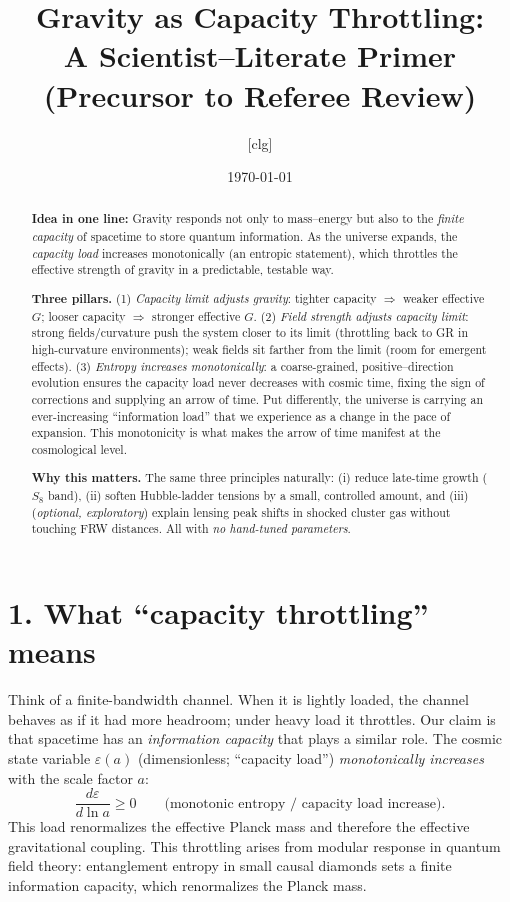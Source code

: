 \documentclass[aps,prd,onecolumn,superscriptaddress,nofootinbib]{revtex4-2}
\newcommand{\eps}{\varepsilon}
\begin{document}
\title{Gravity as Capacity Throttling:\\
A Scientist--Literate Primer (Precursor to Referee Review)}

\author{[clg]}
\affiliation{[Institution(s)]}
\date{\today}

\begin{abstract}
\textbf{Idea in one line:} Gravity responds not only to mass--energy but also to the \emph{finite capacity} of spacetime to store quantum information. As the universe expands, the \emph{capacity load} increases monotonically (an entropic statement), which throttles the effective strength of gravity in a predictable, testable way.

\smallskip
\textbf{Three pillars.}
(1) \emph{Capacity limit adjusts gravity}: tighter capacity $\Rightarrow$ weaker effective $G$; looser capacity $\Rightarrow$ stronger effective $G$.
(2) \emph{Field strength adjusts capacity limit}: strong fields/curvature push the system closer to its limit (throttling back to GR in high-curvature environments); weak fields sit farther from the limit (room for emergent effects).
(3) \emph{Entropy increases monotonically}: a coarse-grained, positive--direction evolution ensures the capacity load never decreases with cosmic time, fixing the sign of corrections and supplying an arrow of time. Put differently, the universe is carrying an ever-increasing ``information load'' that we experience as a change in the pace of expansion. This monotonicity is what makes the arrow of time manifest at the cosmological level.

\smallskip
\textbf{Why this matters.} The same three principles naturally: (i) reduce late-time growth ($S_8$ band), (ii) soften Hubble-ladder tensions by a small, controlled amount, and (iii) (\emph{optional, exploratory}) explain lensing peak shifts in shocked cluster gas without touching FRW distances. All with \emph{no hand-tuned parameters}.
\end{abstract}

\maketitle

\section*{1. What ``capacity throttling'' means}
Think of a finite-bandwidth channel. When it is lightly loaded, the channel behaves as if it had more headroom; under heavy load it throttles. Our claim is that spacetime has an \emph{information capacity} that plays a similar role. The cosmic state variable $\eps(a)$ (dimensionless; ``capacity load'') \emph{monotonically increases} with the scale factor $a$:
\[
\frac{d\eps}{d\ln a} \ge 0 \qquad \text{(monotonic entropy / capacity load increase).}
\]
This load renormalizes the effective Planck mass and therefore the effective gravitational coupling.
This throttling arises from modular response in quantum field theory: entanglement entropy in small causal diamonds sets a finite information capacity, which renormalizes the Planck mass.
\end{document}
